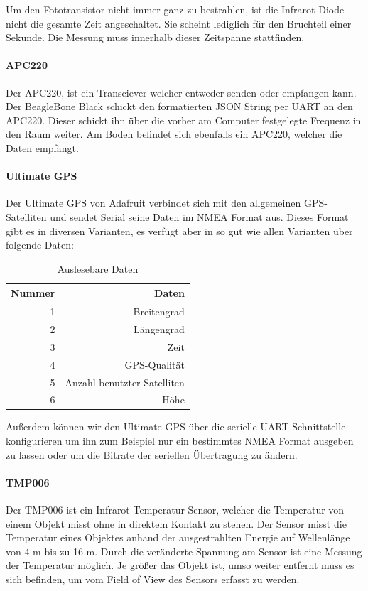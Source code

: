 Um den Fototransistor nicht immer ganz zu bestrahlen, ist die Infrarot Diode nicht die gesamte Zeit angeschaltet. Sie scheint lediglich für den Bruchteil einer Sekunde. Die Messung muss innerhalb dieser Zeitspanne stattfinden.

\paragraph{APC220}
Der APC220, ist ein Transciever welcher entweder senden oder empfangen kann. Der BeagleBone Black schickt den formatierten JSON String per UART an den APC220. Dieser schickt ihn über die vorher am Computer festgelegte Frequenz in den Raum weiter. Am Boden befindet sich ebenfalls ein APC220, welcher die Daten empfängt.

\paragraph{Ultimate GPS}
Der Ultimate GPS von Adafruit verbindet sich mit den allgemeinen GPS-Satelliten und sendet Serial seine Daten im NMEA Format aus. Dieses Format gibt es in diversen Varianten, es verfügt aber in so gut wie allen Varianten über folgende Daten:
\begin{table}[H]
  \centering
    \begin{tabular}{rr}
    \toprule
    \textbf{Nummer} & \textbf{Daten} \\
    \midrule 
    1 & Breitengrad \\
    2 & Längengrad \\
    3 & Zeit \\
    4 & GPS-Qualität \\
    5 & Anzahl benutzter Satelliten \\
    6 & Höhe \\
    \bottomrule
    \end{tabular}
    \caption{Auslesebare Daten}
\end{table}

Außerdem können wir den Ultimate GPS über die serielle UART Schnittstelle konfigurieren um ihn zum Beispiel nur ein bestimmtes NMEA Format ausgeben zu lassen oder um die Bitrate der seriellen Übertragung zu ändern.

\paragraph{TMP006}
Der TMP006 ist ein Infrarot Temperatur Sensor, welcher die Temperatur von einem Objekt misst ohne in direktem Kontakt zu stehen. Der Sensor misst die Temperatur eines Objektes anhand der ausgestrahlten Energie auf Wellenlänge von 4 \textmu m bis zu 16 \textmu m. Durch die veränderte Spannung am Sensor ist eine Messung der Temperatur möglich. Je größer das Objekt ist, umso weiter entfernt muss es sich befinden, um vom Field of View des Sensors erfasst zu werden.

